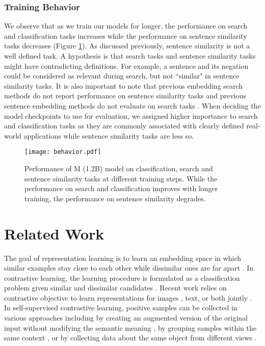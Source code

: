 \documentclass[nohyperref]{article}
\begin{document}
\begin{table}[]
\subsubsection{Training Behavior}
\label{sec:behavior}

We observe that as we train our models for longer, the performance on search and classification tasks increases while the performance on sentence similarity tasks decreases (Figure \ref{fig:behavior}). As discussed previously, sentence similarity is not a well defined task. A hypothesis is that search tasks and sentence similarity tasks might have contradicting definitions. For example, a sentence and its negation could be considered as relevant during search, but  not ``similar" in sentence similarity tasks. It is also important to note that previous embedding search methods do not report performance on sentence similarity tasks \cite{dpr, e2e, contreiver} and previous sentence embedding methods do not evaluate on search tasks \cite{sbert,declutr,simcse}. When deciding the model checkpoints to use for evaluation, we assigned higher importance to search and classification tasks as they are commonly associated with clearly defined real-world applications while sentence similarity tasks are less so. 



\begin{figure}[h]
\centering
\texttt{[image: behavior.pdf]}
\caption{Performance of M (1.2B)  model on classification, search and sentence similarity tasks at different training steps. While the performance on search and classification improves with longer training, the performance on sentence similarity degrades.}
\label{fig:behavior}
\end{figure}


\section{Related Work}
The goal of representation learning \cite{bengio} is to learn an embedding space in which similar examples stay close to each other while dissimilar ones are far apart \cite{hadsell}. In contrastive learning, the learning procedure is formulated as a classification problem given similar and dissimilar candidates \cite{chopra,Gutmann,Schroff,inbatch,Oord}. Recent work relies on contrastive objective to learn representations for images \cite{wu,He,Chen,Zbontar}, text, or both jointly \cite{Lu,Sun,Kim,clip,Khosla}. In self-supervised contrastive learning, positive samples can be collected in various approaches including by creating an augmented version of the original input without modifying the semantic meaning \cite{simcse}, by grouping samples within the same context \cite{declutr,contreiver}, or by collecting data about the same object from different views \cite{tian}. 


\end{table}
\end{document}

